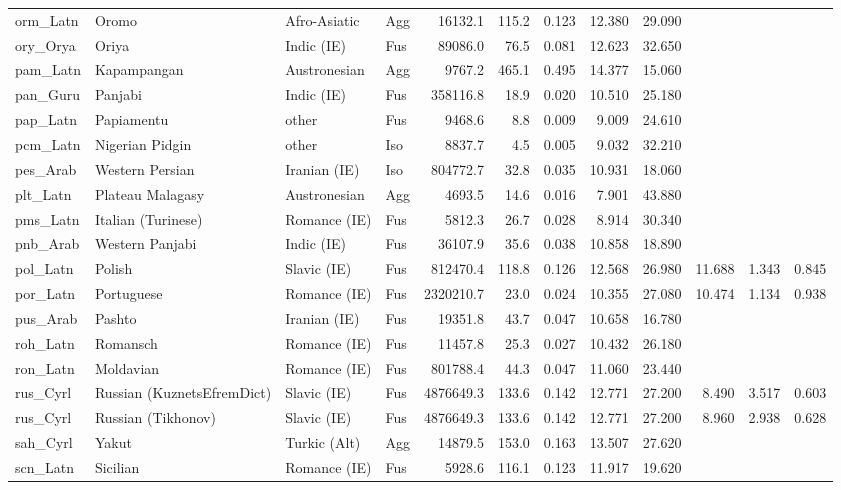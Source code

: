 \begin{tabular}{ll l l rr rr r rr r}
orm\_Latn & Oromo & Afro-Asiatic & Agg & 16132.1 & 115.2 & 0.123 & 12.380 & 29.090 &  &  &  \\
ory\_Orya & Oriya & Indic (IE) & Fus & 89086.0 & 76.5 & 0.081 & 12.623 & 32.650 &  &  &  \\
pam\_Latn & Kapampangan & Austronesian & Agg & 9767.2 & 465.1 & 0.495 & 14.377 & 15.060 &  &  &  \\
pan\_Guru & Panjabi & Indic (IE) & Fus & 358116.8 & 18.9 & 0.020 & 10.510 & 25.180 &  &  &  \\
pap\_Latn & Papiamentu & other & Fus & 9468.6 & 8.8 & 0.009 & 9.009 & 24.610 &  &  &  \\
pcm\_Latn & Nigerian Pidgin & other & Iso & 8837.7 & 4.5 & 0.005 & 9.032 & 32.210 &  &  &  \\
pes\_Arab & Western Persian & Iranian (IE) & Iso & 804772.7 & 32.8 & 0.035 & 10.931 & 18.060 &  &  &  \\
plt\_Latn & Plateau Malagasy & Austronesian & Agg & 4693.5 & 14.6 & 0.016 & 7.901 & 43.880 &  &  &  \\
pms\_Latn & Italian (Turinese) & Romance (IE) & Fus & 5812.3 & 26.7 & 0.028 & 8.914 & 30.340 &  &  &  \\
pnb\_Arab & Western Panjabi & Indic (IE) & Fus & 36107.9 & 35.6 & 0.038 & 10.858 & 18.890 &  &  &  \\
pol\_Latn & Polish & Slavic (IE) & Fus & 812470.4 & 118.8 & 0.126 & 12.568 & 26.980 & 11.688 & 1.343 & 0.845 \\
por\_Latn & Portuguese & Romance (IE) & Fus & 2320210.7 & 23.0 & 0.024 & 10.355 & 27.080 & 10.474 & 1.134 & 0.938 \\
pus\_Arab & Pashto & Iranian (IE) & Fus & 19351.8 & 43.7 & 0.047 & 10.658 & 16.780 &  &  &  \\
roh\_Latn & Romansch & Romance (IE) & Fus & 11457.8 & 25.3 & 0.027 & 10.432 & 26.180 &  &  &  \\
ron\_Latn & Moldavian & Romance (IE) & Fus & 801788.4 & 44.3 & 0.047 & 11.060 & 23.440 &  &  &  \\
rus\_Cyrl & Russian (KuznetsEfremDict) & Slavic (IE) & Fus & 4876649.3 & 133.6 & 0.142 & 12.771 & 27.200 & 8.490 & 3.517 & 0.603 \\
rus\_Cyrl & Russian (Tikhonov) & Slavic (IE) & Fus & 4876649.3 & 133.6 & 0.142 & 12.771 & 27.200 & 8.960 & 2.938 & 0.628 \\
sah\_Cyrl & Yakut & Turkic (Alt) & Agg & 14879.5 & 153.0 & 0.163 & 13.507 & 27.620 &  &  &  \\
scn\_Latn & Sicilian & Romance (IE) & Fus & 5928.6 & 116.1 & 0.123 & 11.917 & 19.620 &  &  &  \\

\end{tabular}
